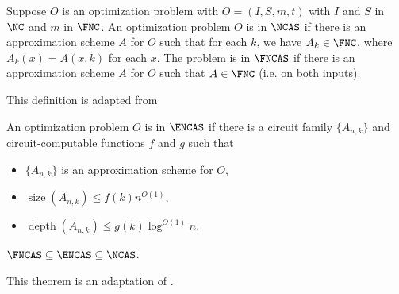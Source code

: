 \documentclass{article}
\DeclareMathOperator{\depth}{depth}
\DeclareMathOperator{\size}{size}
\begin{document}
\begin{definition}
  Suppose $O$ is an optimization problem with $O = (I, S, m, t)$ with $I$ and $S$ in $\NC$ and $m$ in $\FNC$.
  An optimization problem $O$ is in $\NCAS$ if there is an approximation scheme $A$ for $O$ such that for each $k$, we have $A_k \in \FNC$, where $A_k(x) = A(x, k)$ for each $x$.
  The problem is in $\FNCAS$ if there is an approximation scheme $A$ for $O$ such that $A \in \FNC$ (i.e. on both inputs).
\end{definition}

This definition is adapted from \autocite[Definition~1.31]{fg06}

\begin{definition}
  An optimization problem $O$ is in $\ENCAS$ if there is a circuit family $\{A_{n, k}\}$ and circuit-computable functions $f$ and $g$ such that
  \begin{itemize}
  \item $\{A_{n, k}\}$ is an approximation scheme for $O$,
  \item $\size(A_{n, k}) \leq f(k) n^{O(1)}$,
  \item $\depth(A_{n, k}) \leq g(k) \log^{O(1)} n$.
  \end{itemize}
\end{definition}

\begin{proposition}\label{prop:encas}
  $\FNCAS \subseteq \ENCAS \subseteq \NCAS$.
\end{proposition}

This theorem is an adaptation of \autocite[Theorem~1.32]{fg06}.
\end{document}
